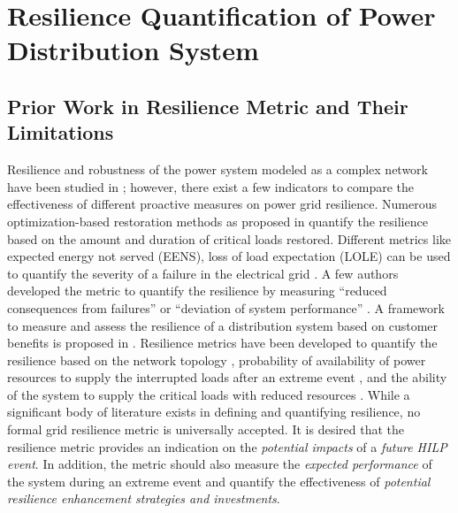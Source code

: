 \documentclass[12pt]{article}
\begin{document}
\section{Resilience Quantification of Power Distribution System}
\subsection{Prior Work in Resilience Metric and Their Limitations}
Resilience and robustness of the power system modeled as a complex network have been studied in \cite{chanda2015quantifying, arab2015stochastic}; however, there exist a few indicators to compare the effectiveness of different proactive measures on power grid resilience. Numerous optimization-based restoration methods as proposed in \cite{gao2016resilience, chen2018multi, poudel2018critical} quantify the resilience based on the amount and duration of critical loads restored. Different metrics like expected energy not served (EENS), loss of load expectation (LOLE) can be used to quantify the severity of a failure in the electrical grid \cite{nedic2006criticality, allan2013reliability}.  A few authors developed the metric to quantify the resilience by measuring ``reduced consequences from failures'' or ``deviation of system performance'' \cite{refe, rose2007economic}. A framework to measure and assess the resilience of a distribution system based on customer benefits is proposed in \cite{kwasinski2016quantitative}. Resilience metrics have been developed to quantify the resilience based on the network topology \cite{chanda2016defining}, probability of availability of power resources to supply the interrupted loads after an extreme event \cite{bajpai2018novel}, and the ability of the system to supply the critical loads with reduced resources \cite{chanda2018quantifying}.
While a significant body of literature exists in defining and quantifying resilience, no formal grid resilience metric is universally accepted. %
It is desired that the resilience metric provides an indication on the \textit{potential impacts} of a \textit{future HILP event}. In addition, the metric should also measure the \textit{expected performance} of the system during an extreme event and quantify the effectiveness of \textit{potential resilience enhancement strategies and investments}. 
\end{document}
